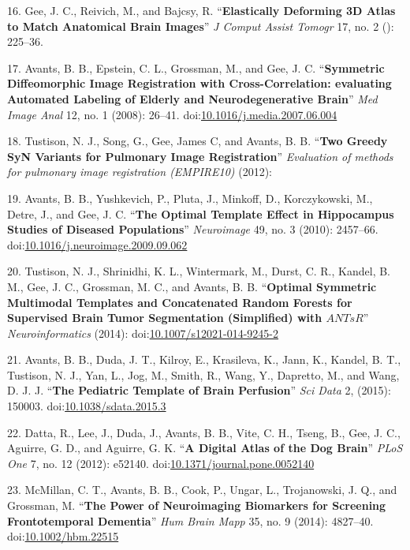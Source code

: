 \documentclass[11pt,]{article}
\begin{document}
16. Gee, J. C., Reivich, M., and Bajcsy, R. ``\textbf{Elastically
Deforming 3D Atlas to Match Anatomical Brain Images}'' \emph{J Comput
Assist Tomogr} 17, no. 2 (): 225--36.

17. Avants, B. B., Epstein, C. L., Grossman, M., and Gee, J. C.
``\textbf{Symmetric Diffeomorphic Image Registration with
Cross-Correlation: evaluating Automated Labeling of Elderly and
Neurodegenerative Brain}'' \emph{Med Image Anal} 12, no. 1 (2008):
26--41.
doi:\href{http://dx.doi.org/10.1016/j.media.2007.06.004}{10.1016/j.media.2007.06.004}

18. Tustison, N. J., Song, G., Gee, James C, and Avants, B. B.
``\textbf{Two Greedy SyN Variants for Pulmonary Image Registration}''
\emph{Evaluation of methods for pulmonary image registration (EMPIRE10)}
(2012):

19. Avants, B. B., Yushkevich, P., Pluta, J., Minkoff, D., Korczykowski,
M., Detre, J., and Gee, J. C. ``\textbf{The Optimal Template Effect in
Hippocampus Studies of Diseased Populations}'' \emph{Neuroimage} 49, no.
3 (2010): 2457--66.
doi:\href{http://dx.doi.org/10.1016/j.neuroimage.2009.09.062}{10.1016/j.neuroimage.2009.09.062}

20. Tustison, N. J., Shrinidhi, K. L., Wintermark, M., Durst, C. R.,
Kandel, B. M., Gee, J. C., Grossman, M. C., and Avants, B. B.
``\textbf{Optimal Symmetric Multimodal Templates and Concatenated Random
Forests for Supervised Brain Tumor Segmentation (Simplified) with
$ANTsR$}'' \emph{Neuroinformatics} (2014):
doi:\href{http://dx.doi.org/10.1007/s12021-014-9245-2}{10.1007/s12021-014-9245-2}

21. Avants, B. B., Duda, J. T., Kilroy, E., Krasileva, K., Jann, K.,
Kandel, B. T., Tustison, N. J., Yan, L., Jog, M., Smith, R., Wang, Y.,
Dapretto, M., and Wang, D. J. J. ``\textbf{The Pediatric Template of
Brain Perfusion}'' \emph{Sci Data} 2, (2015): 150003.
doi:\href{http://dx.doi.org/10.1038/sdata.2015.3}{10.1038/sdata.2015.3}

22. Datta, R., Lee, J., Duda, J., Avants, B. B., Vite, C. H., Tseng, B.,
Gee, J. C., Aguirre, G. D., and Aguirre, G. K. ``\textbf{A Digital Atlas
of the Dog Brain}'' \emph{PLoS One} 7, no. 12 (2012): e52140.
doi:\href{http://dx.doi.org/10.1371/journal.pone.0052140}{10.1371/journal.pone.0052140}

23. McMillan, C. T., Avants, B. B., Cook, P., Ungar, L., Trojanowski, J.
Q., and Grossman, M. ``\textbf{The Power of Neuroimaging Biomarkers for
Screening Frontotemporal Dementia}'' \emph{Hum Brain Mapp} 35, no. 9
(2014): 4827--40.
doi:\href{http://dx.doi.org/10.1002/hbm.22515}{10.1002/hbm.22515}
\end{document}

